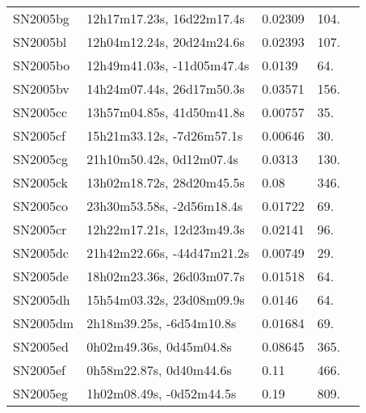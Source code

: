 \begin{longtable}{lllll}
         SN2005bg &      12h17m17.23s, 16d22m17.4s &  0.02309 &           104. &    \citet{1999PASP..111..438F} \\
         SN2005bl &      12h04m12.24s, 20d24m24.6s &  0.02393 &           107. &    \citet{2011ApJ...735..125S} \\
         SN2005bo &     12h49m41.03s, -11d05m47.4s &   0.0139 &            64. &  \citet{2003AandA...412...57P} \\
         SN2005bv &      14h24m07.44s, 26d17m50.3s &  0.03571 &           156. &    \citet{2007SDSS6.C...0000:} \\
         SN2005cc &      13h57m04.85s, 41d50m41.8s &  0.00757 &            35. &  \citet{2001AandA...378..370V} \\
         SN2005cf &      15h21m33.12s, -7d26m57.1s &  0.00646 &            30. &    \citet{1992NED11.R......1N} \\
         SN2005cg &       21h10m50.42s, 0d12m07.4s &   0.0313 &           130. &    \citet{2006ApJ...636..400Q} \\
         SN2005ck &      13h02m18.72s, 28d20m45.5s &     0.08 &           346. &    \citet{2005IAUC.8542A...1P} \\
         SN2005co &      23h30m53.58s, -2d56m18.4s &  0.01722 &            69. &    \citet{1993AJ....105.1637H} \\
         SN2005cr &      12h22m17.21s, 12d23m49.3s &  0.02141 &            96. &    \citet{2005SDSS4.C...0000:} \\
         SN2005dc &     21h42m22.66s, -44d47m21.2s &  0.00749 &            29. &    \citet{1996ApJ...470..172S} \\
         SN2005de &      18h02m23.36s, 26d03m07.7s &  0.01518 &            64. &    \citet{1992ApJS...83...29S} \\
         SN2005dh &      15h54m03.32s, 23d08m09.9s &   0.0146 &            64. &    \citet{2007SDSS6.C...0000:} \\
         SN2005dm &       2h18m39.25s, -6d54m10.8s &  0.01684 &            69. &    \citet{1998AJ....116....1D} \\
         SN2005ed &        0h02m49.36s, 0d45m04.8s &  0.08645 &           365. &    \citet{2016SDSSD.C...0000:} \\
         SN2005ef &        0h58m22.87s, 0d40m44.6s &     0.11 &           466. &    \citet{2005CBET..229A...1B} \\
         SN2005eg &       1h02m08.49s, -0d52m44.5s &     0.19 &           809. &    \citet{2005CBET..229A...1B} \\

\end{longtable}
